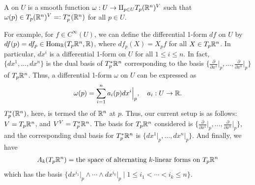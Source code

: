 \begin{definition}
    A  on $U$ is a smooth function $\omega:U \to \amalg_{p \in U} T_{p}(\mathbb{R}^{n})^{V}$ such that $\omega(p) \in T_{p}(\mathbb{R}^{n})^{V} =\vcentcolon T_{p}^{\ast}(\mathbb{R}^{n})$ for all $p \in U$. 
\end{definition}
For example, for $f \in C^{\infty}(U)$, we can define the differential 1-form $df$ on $U$ by $df(p) = df_{p} \in \operatorname{Hom}_{\mathbb{R}}(T_{p}\mathbb{R}^{n},\mathbb{R})$, where $df_{p}(X) = X_{p}f$ for all $X \in T_{p}\mathbb{R}^{n}$. In particular, $dx^{i}$ is a differential 1-form on $U$ for all $1 \leq i \leq n$. In fact, $\{dx^{1},\ldots,dx^{n}\}$ is the dual basis of $T_{p}^{\ast}\mathbb{R}^{n}$ corresponding to the basis $\{\frac{\partial}{\partial x^{1}}\Big|_{p},\ldots,\frac{\partial}{\partial x^{n}}\Big|_{p}\}$ of $T_{p}\mathbb{R}^{n}$. Thus, a differential 1-form $\omega$ on $U$ can be expressed as
\begin{align}
    \omega(p) = \sum_{i=1}^{n} a_{i}(p) dx^{i}\Big|_{p}, \quad a_{i}:U \to \mathbb{R}.
\end{align}
$T_{p}^{\ast}(\mathbb{R}^{n})$, here, is termed the  of $\mathbb{R}^{n}$ at $p$. Thus, our current setup is as follows: $V = T_{p}\mathbb{R}^{n}$, and $V^{V} = T_{p}^{\ast}\mathbb{R}^{n}$. The basis for $T_{p}\mathbb{R}^{n}$ considered is $\{\frac{\partial}{\partial x^{1}}\Big|_{p},\ldots,\frac{\partial}{\partial x^{n}}\Big|_{p}\}$, and the corresponding dual basis for $T_{p}^{\ast}\mathbb{R}^{n}$ is $\{dx^{1}\Big|_{p},\ldots,dx^{n}\Big|_{p}\}$. And finally, we have
\begin{align}
    A_{k}(T_{p}\mathbb{R}^{n}) = \text{the space of alternating $k$-linear forms on $T_{p}\mathbb{R}^{n}$}
\end{align}
which has the basis $\{dx^{i_{1}}\Big|_{p} \wedge \cdots \wedge dx^{i_{k}}\Big|_{p} \mid 1 \leq i_{1} < \cdots < i_{k} \leq n\}$.

